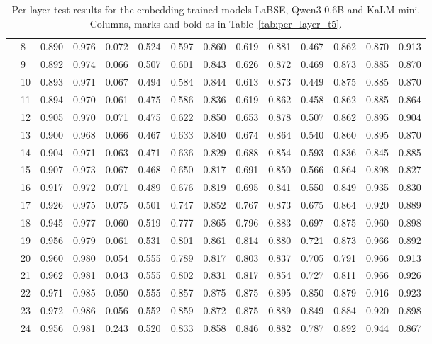 \begin{table}[p]
\begin{tabular}{llcccccccccccc}
 & 8 & 0.890 & 0.976 & 0.072 & 0.524 & 0.597 & 0.860 & 0.619 & 0.881 & 0.467 & 0.862 & 0.870 & 0.913 \\
 & 9 & 0.892 & 0.974 & 0.066 & 0.507 & 0.601 & 0.843 & 0.626 & 0.872 & 0.469 & 0.873 & 0.885 & 0.870 \\
 & 10 & 0.893 & 0.971 & 0.067 & 0.494 & 0.584 & 0.844 & 0.613 & 0.873 & 0.449 & 0.875 & 0.885 & 0.870 \\
 & 11 & 0.894 & 0.970 & 0.061 & 0.475 & 0.586 & 0.836 & 0.619 & 0.862 & 0.458 & 0.862 & 0.885 & 0.864 \\
 & 12 & 0.905 & 0.970 & 0.071 & 0.475 & 0.622 & 0.850 & 0.653 & 0.878 & 0.507 & 0.862 & 0.895 & 0.904 \\
 & 13 & 0.900 & 0.968 & 0.066 & 0.467 & 0.633 & 0.840 & 0.674 & 0.864 & 0.540 & 0.860 & 0.895 & 0.870 \\
 & 14 & 0.904 & 0.971 & 0.063 & 0.471 & 0.636 & 0.829 & 0.688 & 0.854 & 0.593 & 0.836 & 0.845 & 0.885 \\
 & 15 & 0.907 & 0.973 & 0.067 & 0.468 & 0.650 & 0.817 & 0.691 & 0.850 & 0.566 & 0.864 & 0.898 & 0.827 \\
 & 16 & 0.917 & 0.972 & 0.071 & 0.489 & 0.676 & 0.819 & 0.695 & 0.841 & 0.550 & 0.849 & 0.935 & 0.830 \\
 & 17 & 0.926 & 0.975 & 0.075 & 0.501 & 0.747 & 0.852 & 0.767 & 0.873 & 0.675 & 0.864 & 0.920 & 0.889 \\
 & 18 & 0.945 & 0.977 & 0.060 & 0.519 & 0.777 & 0.865 & 0.796 & 0.883 & 0.697 & 0.875 & 0.960 & 0.898 \\
 & 19 & 0.956 & 0.979 & 0.061 & 0.531 & 0.801 & 0.861 & 0.814 & 0.880 & 0.721 & 0.873 & 0.966 & 0.892 \\
 & 20 & 0.960 & 0.980 & 0.054 & 0.555 & 0.789 & 0.817 & 0.803 & 0.837 & 0.705 & 0.791 & 0.966 & 0.913 \\
 & 21 & 0.962 & 0.981 & 0.043 & 0.555 & 0.802 & 0.831 & 0.817 & 0.854 & 0.727 & 0.811 & 0.966 & 0.926 \\
 & 22 & 0.971 & 0.985 & 0.050 & 0.555 & 0.857 & 0.875 & 0.875 & 0.895 & 0.850 & 0.879 & 0.916 & 0.923 \\
 & 23 & 0.972 & 0.986 & 0.056 & 0.552 & 0.859 & 0.872 & 0.875 & 0.889 & 0.849 & 0.884 & 0.920 & 0.898 \\
 & 24 & 0.956 & 0.981 & 0.243 & 0.520 & 0.833 & 0.858 & 0.846 & 0.882 & 0.787 & 0.892 & 0.944 & 0.867 \\
\bottomrule
\end{tabular}
\caption{Per-layer test results for the embedding-trained models LaBSE, Qwen3-0.6B and KaLM-mini. Columns, marks and bold as in Table~\ref{tab:per_layer_t5}.}
\label{tab:per_layer_emb}
\end{table}
